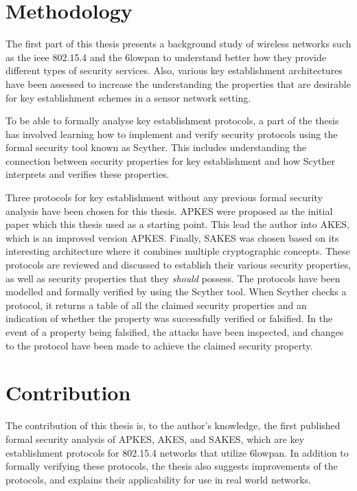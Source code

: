 \section{Methodology}

The first part of this thesis presents a background study of wireless networks such as the \gls{ieee} 802.15.4 and the \gls{6lowpan} to understand better how they provide different types of security services. Also, various key establishment architectures have been assessed to increase the understanding the properties that are desirable for key establishment schemes in a sensor network setting.

To be able to formally analyse key establishment protocols, a part of the thesis has involved learning how to implement and verify security protocols using the formal security tool known as Scyther. This includes understanding the connection between security properties for key establishment and how Scyther interprets and verifies these properties.

Three protocols for key establishment without any previous formal security analysis have been chosen for this thesis. APKES were proposed as the initial paper which this thesis used as a starting point. This lead the author into AKES, which is an improved version APKES. Finally, SAKES was chosen based on its interesting architecture where it combines multiple cryptographic concepts. These protocols are reviewed and discussed to establish their various security properties, as well as security properties that they \textit{should} possess. The protocols have been modelled and formally verified by using the Scyther tool. When Scyther checks a protocol, it returns a table of all the claimed security properties and an indication of whether the property was successfully verified or falsified. In the event of a property being falsified, the attacks have been inspected, and changes to the protocol have been made to achieve the claimed security property. 

\section{Contribution}

The contribution of this thesis is, to the author's knowledge, the first published formal security analysis of APKES, AKES, and SAKES, which are key establishment protocols for 802.15.4 networks that utilize \gls{6lowpan}. In addition to formally verifying these protocols, the thesis also suggests improvements of the protocols, and explains their applicability for use in real world networks.

